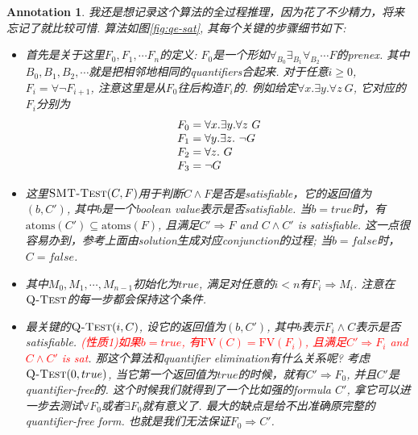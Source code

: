 \documentclass{article}
\newtheorem{annotation}[theorem]{Annotation}
\newcommand{\redt}[1]{\textcolor{red}{#1}}
\begin{document}
\begin{annotation}
我还是想记录这个算法的全过程推理，因为花了不少精力，将来忘记了就比较可惜. 算法如图\ref{fig:qe-sat}, 其每个关键的步骤细节如下:
\begin{itemize}
    \item 首先是关于这里$F_0, F_1, \cdots F_n$的定义: $F_0$是一个形如$\forall_{B_0}\exists_{B_1}\forall_{B_2}\cdots F$的prenex. 其中$B_0,B_1,B_2,\cdots$就是把相邻地相同的quantifiers合起来. 对于任意$i \geq 0$, $F_i = \forall \neg F_{i+1}$, 注意这里是从$F_0$往后构造$F_i$的. 例如给定$\forall x. \exists y.\forall z~G$, 它对应的$F_i$分别为
    \[
        \begin{tabular}{l}
        $F_0 = \forall x. \exists y.\forall z~G$ \\
        $F_1 = \forall y. \exists z.~\neg G$ \\
        $F_2 = \forall z.~G$ \\
        $F_3 = \neg G$
        \end{tabular}
    \]
    \item 这里$\textsc{SMT-Test}(C, F)$用于判断$C \wedge F$是否是satisfiable，它的返回值为$(b, C')$, 其中$b$是一个boolean value表示是否satisfiable. 当$b = true$时，有$\text{atoms}(C') \subseteq \text{atoms}(F)$, 且满足$C' \Rightarrow F$ and $C \wedge C'$ is satisfiable. 这一点很容易办到，参考上面由solution生成对应conjunction的过程; 当$b=false$时，$C = false$.
    \item 其中$M_0,M_1,\cdots,M_{n-1}$初始化为$true$, 满足对任意的$i < n$有$F_i \Rightarrow M_i$. 注意在$\textsc{Q-Test}$的每一步都会保持这个条件.
    \item 最关键的$\textsc{Q-Test}(i, C)$, 设它的返回值为$(b, C')$, 其中$b$表示$F_i \wedge C$表示是否satisfiable. \redt{(性质1)如果$b = true$, 有$\text{FV}(C) = \text{FV}(F_i)$, 且满足$C' \Rightarrow F_i$ and $C \wedge C'$ is sat}. 那这个算法和quantifier elimination有什么关系呢? 考虑$\textsc{Q-Test}(0, true)$, 当它第一个返回值为$true$的时候，就有$C' \Rightarrow F_0$, 并且$C'$是quantifier-free的. 这个时候我们就得到了一个比如强的formula $C'$, 拿它可以进一步去测试$\forall F_0$或者$\exists F_0$就有意义了. 最大的缺点是给不出准确原完整的quantifier-free form. 也就是我们无法保证$F_0 \Rightarrow C'$.
    
    

\end{itemize}
\end{annotation}
\end{document}
